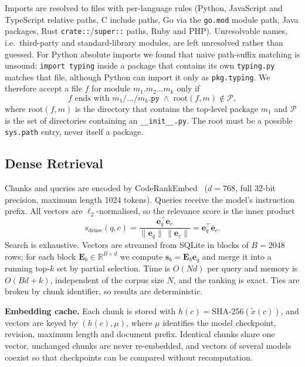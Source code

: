\documentclass[conference]{IEEEtran}
\begin{document}
Imports are resolved to files with per-language rules (Python, JavaScript and
TypeScript relative paths, C include paths, Go via the \texttt{go.mod} module
path, Java packages, Rust \texttt{crate::}/\texttt{super::} paths, Ruby and
PHP). Unresolvable names, i.e.\ third-party and standard-library modules, are
left unresolved rather than guessed. For Python absolute imports we found that
naive path-suffix matching is unsound: \texttt{import typing} inside a package
that contains its own \texttt{typing.py} matches that file, although Python can
import it only as \texttt{pkg.typing}. We therefore accept a file $f$ for module
$m_1.m_2\ldots m_k$ only if
\begin{equation}
  f \text{ ends with } m_1/\ldots/m_k\texttt{.py} \;\wedge\; \text{root}(f, m) \notin \mathcal{P},
\end{equation}
where $\text{root}(f, m)$ is the directory that contains the top-level package
$m_1$ and $\mathcal{P}$ is the set of directories containing an
\texttt{\_\_init\_\_.py}. The root must be a possible \texttt{sys.path}
entry, never itself a package.

\subsection{Dense Retrieval}\label{sec:retrieval}
Chunks and queries are encoded by CodeRankEmbed~\cite{suresh2025cornstack}
($d = 768$, full 32-bit precision, maximum length 1024 tokens). Queries receive
the model's instruction prefix. All vectors are $\ell_2$-normalised, so the
relevance score is the inner product
\begin{equation}
  s_{\text{dense}}(q, c) = \frac{\mathbf{e}_q^{\top}\mathbf{e}_c}{\lVert\mathbf{e}_q\rVert\,\lVert\mathbf{e}_c\rVert} = \mathbf{e}_q^{\top}\mathbf{e}_c .
\end{equation}
Search is exhaustive. Vectors are streamed from SQLite in blocks of $B = 2048$
rows; for each block $\mathbf{E}_b \in \mathbb{R}^{B \times d}$ we compute
$\mathbf{s}_b = \mathbf{E}_b \mathbf{e}_q$ and merge it into a running top-$k$
set by partial selection. Time is $O(Nd)$ per query and memory is
$O(Bd + k)$, independent of the corpus size $N$, and the ranking is exact.
Ties are broken by chunk identifier, so results are deterministic.

\textbf{Embedding cache.} Each chunk is stored with
$h(c) = \text{SHA-256}(\tilde{x}(c))$, and vectors are keyed by $(h(c), \mu)$,
where $\mu$ identifies the model checkpoint, revision, maximum length and
document prefix. Identical chunks share one vector, unchanged chunks are never
re-embedded, and vectors of several models coexist so that checkpoints can be
compared without recomputation.
\end{document}
